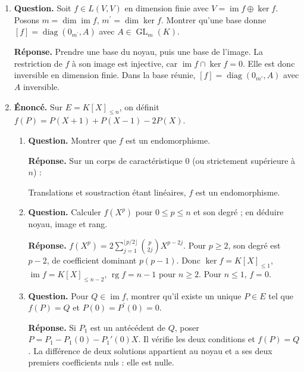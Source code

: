 \documentclass[12pt, a4paper]{article}
\begin{document}
\begin{enumerate}[label=7.\arabic*., start=68]
  \item \begin{minipage}[t]{\linewidth}\raggedright
\textbf{Question.} Soit $f\in L(V,V)$ en dimension finie avec $V=\operatorname{im}f\oplus\ker f$. Posons $m=\dim\operatorname{im}f$, $m^{\prime}=\dim\ker f$. Montrer qu’une base donne $[f]=\operatorname{diag}(0_{m^{\prime}},A)$ avec $A\in\operatorname{GL}_m(K)$.
\par\smallskip
\textbf{Réponse.} Prendre une base du noyau, puis une base de l'image.
    La restriction de $f$ à son image est injective, car $\operatorname{im}f\cap\ker f=0$.
    Elle est donc inversible en dimension finie.
    Dans la base réunie, $[f]=\operatorname{diag}(0_{m'},A)$ avec $A$ inversible.
\end{minipage}

  \item \begin{minipage}[t]{\linewidth}\raggedright
\textbf{Énoncé.} Sur $E=K[X]_{\leq n}$, on définit $f(P)=P(X+1)+P(X-1)-2P(X)$.

\begin{enumerate}[\arabic*.]
        \item \textbf{Question.} Montrer que $f$ est un endomorphisme.
\par\smallskip
\textbf{Réponse.} Sur un corps de caractéristique $0$ (ou strictement supérieure à $n$) :

Translations et soustraction étant linéaires, $f$ est un endomorphisme.

  \item \textbf{Question.} Calculer $f(X^p)$ pour $0\leq p\leq n$ et son degré ; en déduire noyau, image et rang.
\par\smallskip
\textbf{Réponse.} $\displaystyle f(X^p)=2\sum_{j=1}^{\lfloor p/2\rfloor}\binom p{2j}X^{p-2j}$.
        Pour $p\geq2$, son degré est $p-2$, de coefficient dominant $p(p-1)$.
        Donc $\ker f=K[X]_{\leq1}$, $\operatorname{im}f=K[X]_{\leq n-2}$, $\operatorname{rg}f=n-1$ pour $n\geq2$.
        Pour $n\leq1$, $f=0$.

  \item \textbf{Question.} Pour $Q\in\operatorname{im}f$, montrer qu’il existe un unique $P\in E$ tel que $f(P)=Q$ et $P(0)=P^{\prime}(0)=0$.
\par\smallskip
\textbf{Réponse.} Si $P_1$ est un antécédent de $Q$, poser $P=P_1-P_1(0)-P_1'(0)X$.
        Il vérifie les deux conditions et $f(P)=Q$.
        La différence de deux solutions appartient au noyau et a ses deux premiers coefficients nuls : elle est nulle.


\end{enumerate}
\end{minipage}
\end{enumerate}
\end{document}

